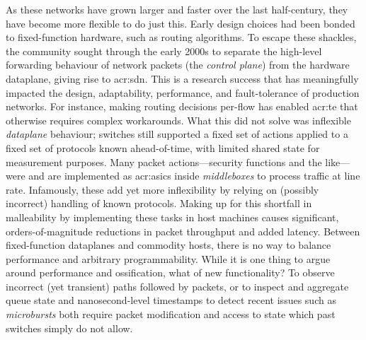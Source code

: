 As these networks have grown larger and faster over the last half-century, they have become more flexible to do just this.
Early design choices had been bonded to fixed-function hardware, such as routing algorithms.
To escape these shackles, the community sought through the early 2000s to separate the high-level forwarding behaviour of network packets (the \emph{control plane}) from the hardware dataplane, giving rise to \gls{acr:sdn}.
This is a research success that has meaningfully impacted the design, adaptability, performance, and fault-tolerance of production networks.
For instance, making routing decisions per-flow has enabled \gls{acr:te} that otherwise requires complex workarounds.
What this did not solve was inflexible \emph{dataplane} behaviour; switches still supported a fixed set of actions applied to a fixed set of protocols known ahead-of-time, with limited shared state for measurement purposes.
Many packet actions---security functions and the like---were and are implemented as \glspl{acr:asic} inside \emph{middleboxes} to process traffic at line rate.
Infamously, these add yet more inflexibility by relying on (possibly incorrect) handling of known protocols.
Making up for this shortfall in malleability by implementing these tasks in host machines causes significant, orders-of-magnitude reductions in packet throughput and added latency.
Between fixed-function dataplanes and commodity hosts, there is no way to balance performance and arbitrary programmability.
While it is one thing to argue around performance and ossification, what of new functionality?
To observe incorrect (yet transient) paths followed by packets, or to inspect and aggregate queue state and nanosecond-level timestamps to detect recent issues such as \emph{microbursts} both require packet modification and access to state which past switches simply do not allow.



